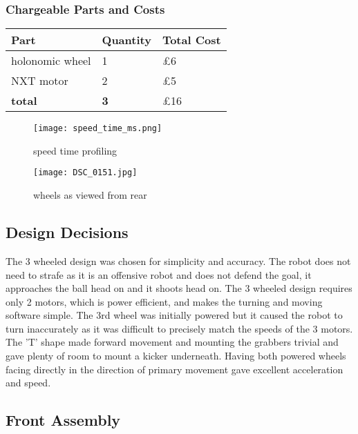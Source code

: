 \documentclass[a4paper]{article}
\begin{document}
\subsubsection{Chargeable Parts and Costs}
\begin{center}
\begin{tabular}{ | m{3cm} | m{3cm}| m{6cm} | }
\hline
\textbf{Part} & \textbf{Quantity} & \textbf{Total Cost} \\
\hline
holonomic wheel & 1 & £6 \\
\hline
NXT motor       & 2 & £5 \\
\hline
\textbf{total} & \textbf{3} & £16 \\
\hline
\end{tabular}
\end{center}


\begin{figure}[!ht]
\caption{speed time profiling}
\centering
\texttt{[image: speed\_time\_ms.png]}
\end{figure}
\begin{figure}[!ht]
\caption{wheels as viewed from rear}
\centering
\texttt{[image: DSC\_0151.jpg]}
\end{figure}

\subsection{Design Decisions}
The 3 wheeled design was chosen for simplicity and accuracy. The robot does not need to strafe as it is an offensive robot and does not defend the goal, it approaches the ball head on and it shoots head on. The 3 wheeled design requires only 2 motors, which is power efficient, and makes the turning and moving software simple. The 3rd wheel was initially powered but it caused the robot to turn inaccurately as it was difficult to precisely match the speeds of the 3 motors. The 'T' shape made forward movement and mounting the grabbers trivial and gave plenty of room to mount a kicker underneath. Having both powered wheels facing directly in the direction of primary movement gave excellent acceleration and speed.

\subsection{Front Assembly}
\end{document}
